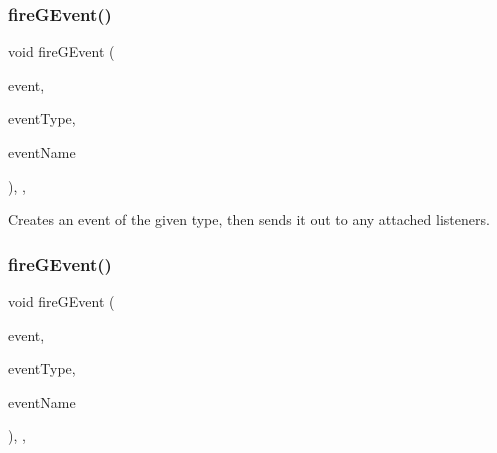 \mbox{\label{classsgl_1_1GObservable_a63fd9034e1e1633c1c38eb342bfd34e9}} 
\subsubsection{\texorpdfstring{fire\+G\+Event()}{fireGEvent()}\hspace{0.1cm}{\footnotesize\ttfamily [5/8]}}
{\footnotesize\ttfamily void fire\+G\+Event (\begin{DoxyParamCaption}\item[{Q\+Resize\+Event $\ast$}]{event,  }\item[{\mbox{\hyperlink{namespacesgl_a2628ea8d12e8b2563c32f05dc7fff6fa}{Event\+Type}}}]{event\+Type,  }\item[{const std\+::string \&}]{event\+Name }\end{DoxyParamCaption})\hspace{0.3cm}{\ttfamily [protected]}, {\ttfamily [virtual]}, {\ttfamily [inherited]}}



Creates an event of the given type, then sends it out to any attached listeners. 

\mbox{\label{classsgl_1_1GObservable_a741345310d9b7c5170a6cbc410c44ac4}} 
\subsubsection{\texorpdfstring{fire\+G\+Event()}{fireGEvent()}\hspace{0.1cm}{\footnotesize\ttfamily [6/8]}}
{\footnotesize\ttfamily void fire\+G\+Event (\begin{DoxyParamCaption}\item[{Q\+Timer\+Event $\ast$}]{event,  }\item[{\mbox{\hyperlink{namespacesgl_a2628ea8d12e8b2563c32f05dc7fff6fa}{Event\+Type}}}]{event\+Type,  }\item[{const std\+::string \&}]{event\+Name }\end{DoxyParamCaption})\hspace{0.3cm}{\ttfamily [protected]}, {\ttfamily [virtual]}, {\ttfamily [inherited]}}



